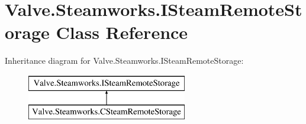 \hypertarget{classValve_1_1Steamworks_1_1ISteamRemoteStorage}{}\section{Valve.\+Steamworks.\+I\+Steam\+Remote\+Storage Class Reference}
\label{classValve_1_1Steamworks_1_1ISteamRemoteStorage}
Inheritance diagram for Valve.\+Steamworks.\+I\+Steam\+Remote\+Storage\+:\begin{figure}[H]
\begin{center}
\leavevmode
\includegraphics[height=2.000000cm]{classValve_1_1Steamworks_1_1ISteamRemoteStorage}
\end{center}
\end{figure}
